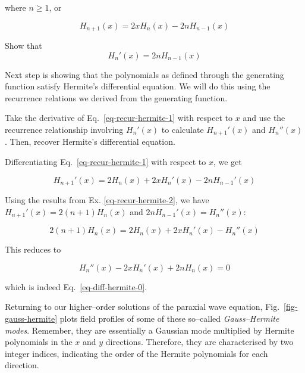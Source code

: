 where $n \geq 1$, or

\begin{equation}
H_{n+1}(x) = 2 x H_n(x) - 2 n H_{n-1}(x)
\label{eq-recur-hermite-1}
\end{equation} 
 

\begin{exer}
Show that
$$\displaystyle H_n'(x) = 2nH_{n-1}(x)$$ \label{eq-recur-hermite-2}
\end{exer}


\pagebreak



Next step is showing that the polynomials as defined through the generating function satisfy Hermite's differential equation. We will do this using the recurrence relations we derived from the generating function.

\begin{cue}
Take the derivative of Eq.~\ref{eq-recur-hermite-1} with respect to $x$ and use the recurrence relationship involving $H_n'(x)$ to calculate  $H_{n+1}'(x)$ and $H_n''(x)$. Then, recover Hermite's differential equation.
\end{cue}

Differentiating Eq.~\ref{eq-recur-hermite-1} with respect to $x$, we get

\begin{equation}
H_{n+1}'(x) = 2  H_n(x) + 2 x H_n'(x)- 2 n H_{n-1}'(x)
\end{equation} 

Using the results from Ex. \ref{eq-recur-hermite-2}, we have $H_{n+1}'(x) = 2(n+1)H_n(x)$ and $2 n H_{n-1}'(x) = H_n''(x)$:

\begin{equation}
2(n+1)H_n(x) = 2  H_n(x) + 2 x H_n'(x)- H_n''(x)
\end{equation} 

This reduces to

\begin{equation}
H_n''(x) - 2 x H_n'(x) + 2n H_n(x) = 0 \label{eq-diff-hermite-1}
\end{equation} 

which is indeed Eq.~\ref{eq-diff-hermite-0}.

Returning to our higher--order solutions of the paraxial wave equation, Fig.~\ref{fig-gauss-hermite} plots field profiles of some of these so--called \emph{Gauss--Hermite modes}. Remember, they are essentially a Gaussian mode multiplied by Hermite polynomials in the $x$ and $y$ directions. Therefore, they are characterised by two integer indices, indicating the order of the Hermite polynomials for each direction.

